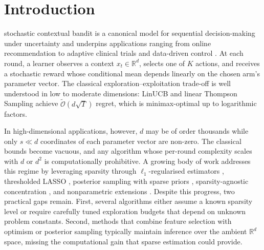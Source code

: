 \documentclass[10pt,journal,twoside,twocolumn]{IEEEtran}
\begin{document}
\section{Introduction}
 stochastic contextual bandit is a canonical model for sequential decision-making under uncertainty and underpins applications ranging from online recommendation to adaptive clinical trials and data-driven control \cite{li2010contextual,slivkins2019introduction}. At each round, a learner observes a context $x_t \in \mathbb{R}^d$, selects one of $K$ actions, and receives a stochastic reward whose conditional mean depends linearly on the chosen arm's parameter vector. The classical exploration--exploitation trade-off is well understood in low to moderate dimensions: LinUCB \cite{chu2011contextual} and linear Thompson Sampling \cite{agrawal2013thompson} achieve $\tilde{\mathcal{O}}(d\sqrt{T})$ regret, which is minimax-optimal up to logarithmic factors.

In high-dimensional applications, however, $d$ may be of order thousands while only $s \ll d$ coordinates of each parameter vector are non-zero. The classical bounds become vacuous, and any algorithm whose per-round complexity scales with $d$ or $d^2$ is computationally prohibitive. A growing body of work addresses this regime by leveraging sparsity through $\ell_1$-regularised estimators \cite{bastani2020online,kim2019doubly,oh2021sparsity,hao2020high}, thresholded LASSO \cite{ariu2022thresholded}, posterior sampling with sparse priors \cite{chakraborty2023thompson}, sparsity-agnostic concentration \cite{jin2024sparsity}, and nonparametric extensions \cite{valko2013kernels}. Despite this progress, two practical gaps remain. First, several algorithms either assume a known sparsity level or require carefully tuned exploration budgets that depend on unknown problem constants. Second, methods that combine feature selection with optimism or posterior sampling typically maintain inference over the ambient $\mathbb{R}^d$ space, missing the computational gain that sparse estimation could provide.
\end{document}
